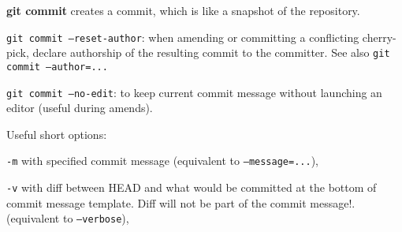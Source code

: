 %

\textbf{git commit} creates a commit, which is like a snapshot of the repository.

\texttt{git commit --reset-author}: when amending or committing a conflicting cherry-pick, declare authorship of the resulting commit to the committer.
See also \texttt{git commit --author=...}

\texttt{git commit --no-edit}: to keep current commit message without launching an editor (useful during amends).

Useful short options:
\begin{compactenum}
\item [\texttt{-m}] with specified commit message (equivalent to \texttt{--message=...}),
\item [\texttt{-v}] with diff between HEAD and what would be committed at the bottom of commit message template.
Diff will not be part of the commit message!.
(equivalent to \texttt{--verbose}),
\end{compactenum}

%